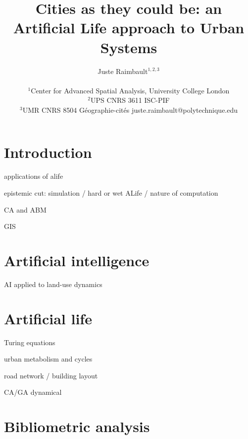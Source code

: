\documentclass[letterpaper]{article}
\title{Cities as they could be: an Artificial Life approach to Urban Systems}
\author{Juste Raimbault$^{1,2,3}$\\
\mbox{}\\
$^1$Center for Advanced Spatial Analysis, University College London\\
$^2$UPS CNRS 3611 ISC-PIF\\
$^3$UMR CNRS 8504 G{\'e}ographie-cit{\'e}s
juste.raimbault@polytechnique.edu} %
\begin{document}
\maketitle

\begin{abstract}
  
\end{abstract}

\section{Introduction}

\cite{kim2006comprehensive} applications of alife


\cite{pattee1995artificial} epistemic cut: simulation / hard or wet ALife / nature of computation


\cite{torrens2003automata} CA and ABM

\cite{openshaw1995developing} GIS




\section{Artificial intelligence}


\cite{wu2010artificial} AI applied to land-use dynamics

\cite{white1989artificial}


\section{Artificial life}

\cite{medda2009morphogenetic} Turing equations

\cite{olsen1982urban} urban metabolism and cycles

\cite{kato1998alife} road network / building layout

\cite{kato2000modeling} CA/GA dynamical


\section{Bibliometric analysis}

\end{document}
